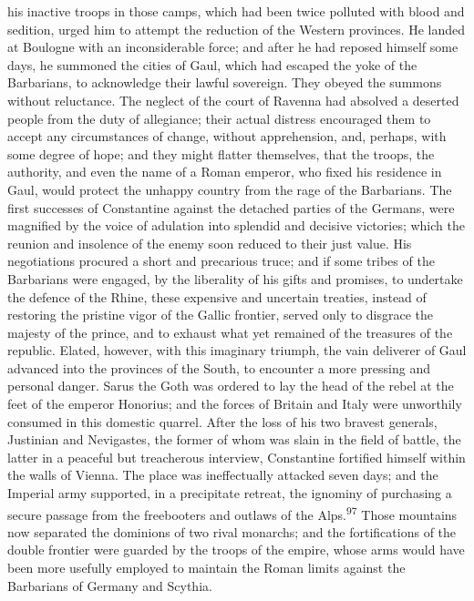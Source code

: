 his inactive troops in those camps, which had been twice polluted
with blood and sedition, urged him to attempt the reduction of
the Western provinces. He landed at Boulogne with an
inconsiderable force; and after he had reposed himself some days,
he summoned the cities of Gaul, which had escaped the yoke of the
Barbarians, to acknowledge their lawful sovereign. They obeyed
the summons without reluctance. The neglect of the court of
Ravenna had absolved a deserted people from the duty of
allegiance; their actual distress encouraged them to accept any
circumstances of change, without apprehension, and, perhaps, with
some degree of hope; and they might flatter themselves, that the
troops, the authority, and even the name of a Roman emperor, who
fixed his residence in Gaul, would protect the unhappy country
from the rage of the Barbarians. The first successes of
Constantine against the detached parties of the Germans, were
magnified by the voice of adulation into splendid and decisive
victories; which the reunion and insolence of the enemy soon
reduced to their just value. His negotiations procured a short
and precarious truce; and if some tribes of the Barbarians were
engaged, by the liberality of his gifts and promises, to
undertake the defence of the Rhine, these expensive and uncertain
treaties, instead of restoring the pristine vigor of the Gallic
frontier, served only to disgrace the majesty of the prince, and
to exhaust what yet remained of the treasures of the republic.
Elated, however, with this imaginary triumph, the vain deliverer
of Gaul advanced into the provinces of the South, to encounter a
more pressing and personal danger. Sarus the Goth was ordered to
lay the head of the rebel at the feet of the emperor Honorius;
and the forces of Britain and Italy were unworthily consumed in
this domestic quarrel. After the loss of his two bravest
generals, Justinian and Nevigastes, the former of whom was slain
in the field of battle, the latter in a peaceful but treacherous
interview, Constantine fortified himself within the walls of
Vienna. The place was ineffectually attacked seven days; and the
Imperial army supported, in a precipitate retreat, the ignominy
of purchasing a secure passage from the freebooters and outlaws
of the Alps.\textsuperscript{97} Those mountains now separated the dominions of
two rival monarchs; and the fortifications of the double frontier
were guarded by the troops of the empire, whose arms would have
been more usefully employed to maintain the Roman limits against
the Barbarians of Germany and Scythia.


